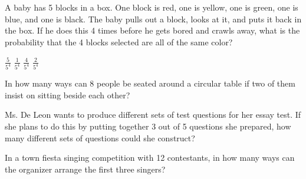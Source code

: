 \begin{questions}
\question A baby has 5 blocks in a box. One block is red, one is yellow, one is green, one is blue, and one is black. The baby pulls out a block, looks at it, and puts it back in the box. If he does this 4 times before he gets bored and crawls away, what is the probability that the 4 blocks selected are all of the same color?  
\begin{multicols}{4}
\begin{choices} 
\choice $\displaystyle \frac{5}{5^{4}}$
\CorrectChoice $\displaystyle \frac{1}{5^{4}}$
\choice $\displaystyle \frac{4}{5^{4}}$
\choice $\displaystyle \frac{2}{5^{4}}$
\end{choices}
\end{multicols}


\question In  how  many  ways  can  8  people  be  seated  around  a  circular  table  if two  of  them  insist  on  sitting  beside  each  other? 
\begin{multicols}{4}
\begin{choices} 
\end{choices}
\end{multicols}


\question Ms. De Leon wants to produce different sets of test questions for her essay test. If she plans to do this by putting together 3 out of 5 questions she prepared, how many different sets of questions could she construct? 
\begin{multicols}{4}
\begin{choices} 
\end{choices}
\end{multicols}


\question In a town fiesta singing competition with 12 contestants, in how many ways can the organizer arrange the first three singers? 
\begin{multicols}{4}
\begin{choices} 
\end{choices}
\end{multicols}



\end{questions}
